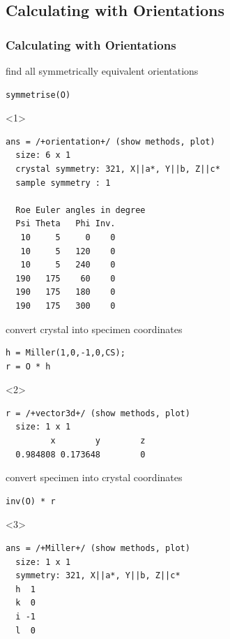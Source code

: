 \documentclass[compress]{beamer}
\begin{document}
\subsection*{Calculating with Orientations}
\label{sec:calc-with-orient}

\begin{frame}
  \frametitle{Calculating with Orientations}


  \begin{overlayarea}{\textwidth}{8cm}
    find all symmetrically equivalent orientations
    \vspace{-.12cm}
\begin{lstlisting}[style=input]
symmetrise(O)
\end{lstlisting}
  \begin{onlyenv}<1>
    \vspace{-.3cm}
    \begin{lstlisting}[style=output]
ans = /+orientation+/ (show methods, plot)
  size: 6 x 1
  crystal symmetry: 321, X||a*, Y||b, Z||c*
  sample symmetry : 1

  Roe Euler angles in degree
  Psi Theta   Phi Inv.
   10     5     0    0
   10     5   120    0
   10     5   240    0
  190   175    60    0
  190   175   180    0
  190   175   300    0
\end{lstlisting}
  \end{onlyenv}

  \pause
  \medskip

  convert crystal into specimen coordinates
      \vspace{-.12cm}
\begin{lstlisting}[style=input]
h = Miller(1,0,-1,0,CS);
r = O * h
\end{lstlisting}
  \begin{onlyenv}<2>
    \vspace{-.3cm}
    \begin{lstlisting}[style=output]
r = /+vector3d+/ (show methods, plot)
  size: 1 x 1
         x        y        z
  0.984808 0.173648        0
\end{lstlisting}
  \end{onlyenv}

  \pause
  \medskip

  convert specimen into crystal coordinates
  \vspace{-.12cm}
\begin{lstlisting}[style=input]
inv(O) * r
\end{lstlisting}
  \begin{onlyenv}<3>
    \vspace{-.3cm}
    \begin{lstlisting}[style=output]
ans = /+Miller+/ (show methods, plot)
  size: 1 x 1
  symmetry: 321, X||a*, Y||b, Z||c*
  h  1
  k  0
  i -1
  l  0
\end{lstlisting}
  \end{onlyenv}


\end{overlayarea}
\end{frame}
\end{document}

